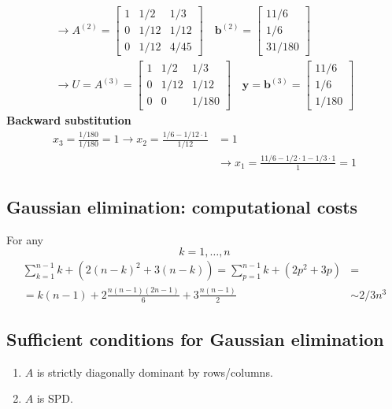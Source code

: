 \documentclass[11pt]{book}
\begin{document}
$$
\begin{gathered}
\longrightarrow A^{(2)}=\left[\begin{array}{ccc}
1 & 1 / 2 & 1 / 3 \\
0 & 1 / 12 & 1 / 12 \\
0 & 1 / 12 & 4 / 45
\end{array}\right] \quad \boldsymbol{b}^{(2)}=\left[\begin{array}{c}
11 / 6 \\
1 / 6 \\
31 / 180
\end{array}\right] \\
\longrightarrow U=A^{(3)}=\left[\begin{array}{ccc}
1 & 1 / 2 & 1 / 3 \\
0 & 1 / 12 & 1 / 12 \\
0 & 0 & 1 / 180
\end{array}\right] \quad \boldsymbol{y}=\boldsymbol{b}^{(3)}=\left[\begin{array}{c}
11 / 6 \\
1 / 6 \\
1 / 180
\end{array}\right]
\end{gathered}
$$
\textbf{Backward substitution}
$$
\begin{aligned}
x_{3}=\frac{1 / 180}{1 / 180}=1 \longrightarrow x_{2}=\frac{1 / 6-1 / 12 \cdot 1}{1 / 12} & =1 \\
& \longrightarrow x_{1}=\frac{11 / 6-1 / 2 \cdot 1-1 / 3 \cdot 1}{1}=1
\end{aligned}
$$

\subsection*{Gaussian elimination: computational costs}
For any $$k=1, \ldots, n$$
$$
\begin{aligned}
\sum_{k=1}^{n-1}  k+ \left(2(n-k)^{2}+3(n-k)\right)=\sum_{p=1}^{n-1}k+\left(2 p^{2}+3 p\right) & = \\
=k(n-1)+ 2 \frac{n(n-1)(2 n-1)}{6}+3 \frac{n(n-1)}{2} & \sim 2 / 3 n^{3}
\end{aligned}
$$

\subsection*{Sufficient conditions for Gaussian elimination}
\begin{enumerate}
  \item $A$ is strictly diagonally dominant by rows/columns.
  \item  $A$ is SPD.
\end{enumerate}
\end{document}
